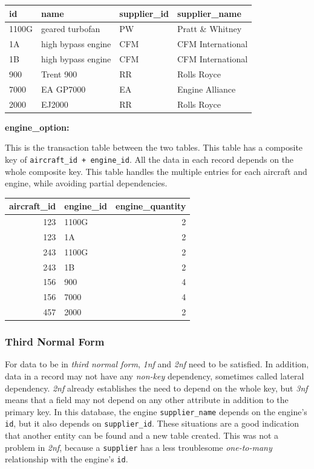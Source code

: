 \documentclass[9pt]{article}
\begin{document}
\begin{center}
\begin{tabular}{llll}
\hline
id & name & supplier\_id & supplier\_name\\
\hline
1100G & geared turbofan & PW & Pratt \& Whitney\\
1A & high bypass engine & CFM & CFM International\\
1B & high bypass engine & CFM & CFM International\\
900 & Trent 900 & RR & Rolls Royce\\
7000 & EA GP7000 & EA & Engine Alliance\\
2000 & EJ2000 & RR & Rolls Royce\\
\hline
\end{tabular}
\end{center}

\textbf{engine\_option:}

This is the transaction table between the two tables. This table has a composite key of \texttt{aircraft\_id + engine\_id}. All the data in each record depends on the whole composite key. This table handles the multiple entries for each aircraft and engine, while avoiding partial dependencies.

\begin{center}
\begin{tabular}{rlr}
\hline
aircraft\_id & engine\_id & engine\_quantity\\
\hline
123 & 1100G & 2\\
123 & 1A & 2\\
243 & 1100G & 2\\
243 & 1B & 2\\
156 & 900 & 4\\
156 & 7000 & 4\\
457 & 2000 & 2\\
\hline
\end{tabular}
\end{center}

\subsubsection{Third Normal Form}
\label{sec:org398c8e2}

For data to be in \emph{third normal form}, \emph{1nf} and \emph{2nf} need to be satisfied. In addition, data in a record may not have any \emph{non-key} dependency, sometimes called lateral dependency. \emph{2nf} already establishes the need to depend on the whole key, but \emph{3nf} means that a field may not depend on any other attribute in addition to the primary key. In this database, the engine \texttt{supplier\_name} depends on the engine's \texttt{id}, but it also depends on \texttt{supplier\_id}. These situations are a good indication that another entity can be found and a new table created. This was not a problem in \emph{2nf}, because a \texttt{supplier} has a less troublesome \emph{one-to-many} relationship with the engine's \texttt{id}.
\end{document}
